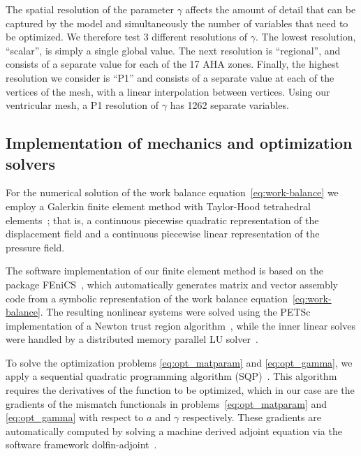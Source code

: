 The spatial resolution of the parameter $\gamma$ affects the amount of detail
that can be captured by the model and simultaneously
the number of variables that need to be optimized. We therefore test 3 different resolutions of $\gamma$.
The lowest resolution, ``scalar'', is simply a single global value.  The next resolution
is ``regional'', and consists of a separate value for each of the 17 AHA zones. Finally, the highest resolution
we consider is ``P1'' and consists of a separate value at each of the vertices of the mesh,
with a linear interpolation between vertices. Using our ventricular mesh, a P1 resolution of $\gamma$ has 1262 separate variables.


\subsection{Implementation of mechanics and optimization solvers}
For the numerical solution of the work balance equation~\eqref{eq:work-balance} we employ a
Galerkin finite element method with Taylor-Hood tetrahedral
elements~\cite{hood1974navier}; that is, a continuous piecewise
quadratic representation of the displacement field and a continuous
piecewise linear representation of the pressure field.  

The software implementation of our finite element method is based on
the package FEniCS~\cite{LoggMardalEtAl2011a}, which automatically
generates matrix and vector assembly code from a symbolic
representation of the work balance equation~\eqref{eq:work-balance}.
The resulting nonlinear systems were solved using the PETSc
implementation of a Newton trust region algorithm~\cite{PETScPackage},
while the inner linear solves were handled by a distributed memory
parallel LU solver~\cite{lidemmel03}.

To solve the optimization problems \eqref{eq:opt_matparam} and
\eqref{eq:opt_gamma}, we apply a sequential quadratic programming
algorithm (SQP)~\cite{kraft1988software}. This algorithm requires the
derivatives of the function to be optimized, which in our case are the
gradients of the mismatch functionals in
problems~\eqref{eq:opt_matparam} and \eqref{eq:opt_gamma} with respect
to $a$ and $\gamma$ respectively. These gradients are
automatically computed by solving a machine derived adjoint equation via the
software framework dolfin-adjoint~\cite{farrell2013automated}.

